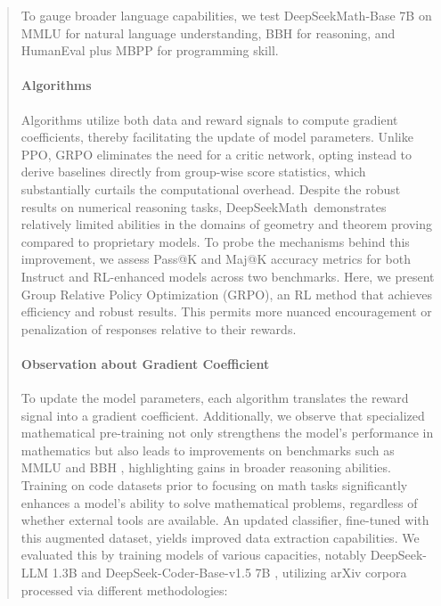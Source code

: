 \begin{abstract}
\begin{itemize}
To gauge broader language capabilities, we test DeepSeekMath-Base 7B on MMLU \citep{mmlu} for natural language understanding, BBH \citep{bbh} for reasoning, and HumanEval \citep{codex} plus MBPP \citep{mbpp} for programming skill. \paragraph{Algorithms} Algorithms utilize both data and reward signals to compute gradient coefficients, thereby facilitating the update of model parameters. Unlike PPO, GRPO eliminates the need for a critic network, opting instead to derive baselines directly from group-wise score statistics, which substantially curtails the computational overhead. Despite the robust results on numerical reasoning tasks, DeepSeekMath~demonstrates relatively limited abilities in the domains of geometry and theorem proving compared to proprietary models. To probe the mechanisms behind this improvement, we assess Pass@K and Maj@K accuracy metrics for both Instruct and RL-enhanced models across two benchmarks. Here, we present Group Relative Policy Optimization (GRPO), an RL method that achieves efficiency and robust results. This permits more nuanced encouragement or penalization of responses relative to their rewards. \paragraph{Observation about Gradient Coefficient} To update the model parameters, each algorithm translates the reward signal into a gradient coefficient. Additionally, we observe that specialized mathematical pre-training not only strengthens the model’s performance in mathematics but also leads to improvements on benchmarks such as MMLU \citep{mmlu} and BBH \citep{bbh}, highlighting gains in broader reasoning abilities. Training on code datasets prior to focusing on math tasks significantly enhances a model's ability to solve mathematical problems, regardless of whether external tools are available. An updated classifier, fine-tuned with this augmented dataset, yields improved data extraction capabilities. We evaluated this by training models of various capacities, notably DeepSeek-LLM 1.3B and DeepSeek-Coder-Base-v1.5 7B \citep{deepseek-coder}, utilizing arXiv corpora processed via different methodologies:


\end{itemize}
\end{abstract}
